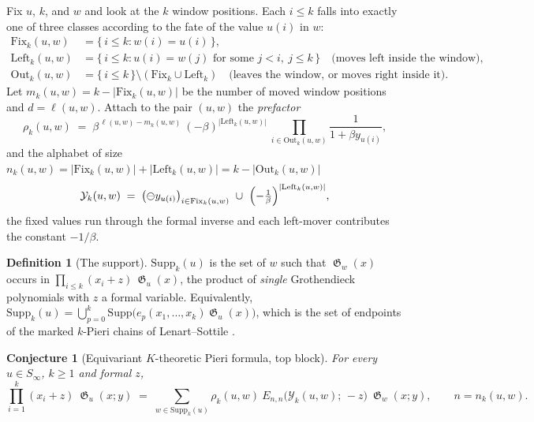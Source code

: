 \documentclass{amsart}
\newtheorem{conjecture}[theorem]{Conjecture}
\theoremstyle{definition}
\newtheorem{definition}[theorem]{Definition}
\theoremstyle{remark}
\DeclareMathOperator{\groth}{\mathfrak{G}}
\newcommand{\fgn}{\ominus}
\newcommand{\Fix}{\mathrm{Fix}}
\newcommand{\Lft}{\mathrm{Left}}
\newcommand{\Out}{\mathrm{Out}}
\newcommand{\Supp}{\mathrm{Supp}}
\begin{document}
Fix $u$, $k$, and $w$ and look at the $k$ window positions. Each $i\le k$ falls into exactly
one of three classes according to the fate of the value $u(i)$ in $w$:
\begin{align*}
\Fix_k(u,w) &= \{\,i\le k : w(i) = u(i)\,\},\\
\Lft_k(u,w) &= \{\,i\le k : u(i) = w(j)\text{ for some } j<i,\ j\le k\,\}
\quad\text{(moves left inside the window)},\\
\Out_k(u,w) &= \{\,i\le k\,\}\setminus(\Fix_k\cup\Lft_k)
\quad\text{(leaves the window, or moves right inside it)}.
\end{align*}
Let $m_k(u,w) = k - |\Fix_k(u,w)|$ be the number of moved window positions and
$d = \ell(u,w)$. Attach to the pair $(u,w)$ the \emph{prefactor}
\begin{equation}\label{eq:pref}
\rho_k(u,w) \;=\; \beta^{\,\ell(u,w) - m_k(u,w)}\ (-\beta)^{|\Lft_k(u,w)|}\ \prod_{i\in\Out_k(u,w)}\frac{1}{1+\beta y_{u(i)}},
\end{equation}
and the alphabet of size $n_k(u,w) = |\Fix_k(u,w)| + |\Lft_k(u,w)| = k - |\Out_k(u,w)|$
\begin{equation}\label{eq:alphabet}
\mathcal{Y}_k(u,w) \;=\; \bigl(\fgn y_{u(i)}\bigr)_{i\in\Fix_k(u,w)}\ \cup\ \Bigl(-\tfrac{1}{\beta}\Bigr)^{|\Lft_k(u,w)|},
\end{equation}
the fixed values run through the formal inverse and each left-mover contributes the constant
$-1/\beta$.

\begin{definition}[The support]\label{def:supp}
$\Supp_k(u)$ is the set of $w$ such that $\groth_w(x)$ occurs in
$\prod_{i\le k}(x_i+z)\,\groth_u(x)$, the product of \emph{single} Grothendieck polynomials
with $z$ a formal variable. Equivalently, $\Supp_k(u) = \bigcup_{p=0}^{k}\Supp\bigl(e_p(x_1,\dots,x_k)\groth_u(x)\bigr)$,
which is the set of endpoints of the marked $k$-Pieri chains of Lenart--Sottile
\cite{lenart2007pieri}.
\end{definition}

\begin{conjecture}[Equivariant $K$-theoretic Pieri formula, top block]\label{conj:top}
For every $u\in S_\infty$, $k\ge1$ and formal $z$,
\begin{equation}\label{eq:top}
\prod_{i=1}^{k}(x_i + z)\ \groth_u(x;y)
\;=\;
\sum_{w\in\Supp_k(u)} \rho_k(u,w)\ E_{n,n}\bigl(\mathcal{Y}_k(u,w);\,-z\bigr)\ \groth_w(x;y),
\qquad n = n_k(u,w).
\end{equation}
\end{conjecture}
\end{document}
